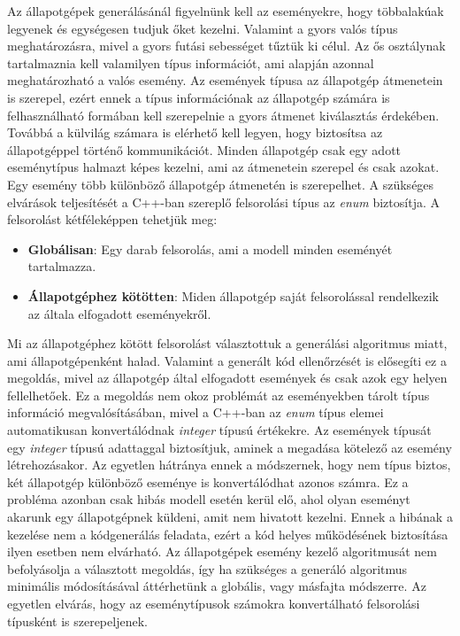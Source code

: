 \documentclass[a4paper,12pt]{report}
\begin{document}
Az állapotgépek generálásánál figyelnünk kell az eseményekre, hogy többalakúak legyenek és egységesen tudjuk őket kezelni. Valamint a gyors valós típus meghatározásra, mivel a gyors futási sebességet tűztük ki célul. Az ős osztálynak tartalmaznia kell valamilyen típus információt, ami alapján azonnal meghatározható a valós esemény. Az események típusa az állapotgép átmenetein is szerepel, ezért ennek a típus információnak az állapotgép számára is felhasználható formában kell szerepelnie a gyors átmenet kiválasztás érdekében. Továbbá a külvilág számara is elérhető kell legyen, hogy biztosítsa az állapotgéppel történő kommunikációt. Minden állapotgép csak egy adott eseménytípus halmazt képes kezelni, ami az átmenetein szerepel és csak azokat. Egy esemény több különböző állapotgép átmenetén is szerepelhet.
A szükséges elvárások teljesítését a C++-ban szereplő felsorolási típus az {\it enum} biztosítja. A felsorolást kétféleképpen tehetjük meg:
\begin{itemize}
\item {\bf Globálisan}: Egy darab felsorolás, ami a modell minden eseményét tartalmazza.
\item {\bf Állapotgéphez kötötten}: Miden állapotgép saját felsorolással rendelkezik az általa elfogadott eseményekről.
\end{itemize}
Mi az állapotgéphez kötött felsorolást választottuk a generálási algoritmus miatt, ami állapotgépenként halad. Valamint a generált kód ellenőrzését is elősegíti ez a megoldás, mivel az állapotgép által elfogadott események és csak azok egy helyen fellelhetőek. Ez a megoldás nem okoz problémát az eseményekben tárolt típus információ megvalósításában, mivel a C++-ban az {\it enum} típus elemei automatikusan konvertálódnak {\it integer} típusú értékekre. Az események típusát egy {\it integer} típusú adattaggal biztosítjuk, aminek a megadása kötelező az esemény létrehozásakor. Az egyetlen hátránya ennek a módszernek, hogy nem típus biztos, két állapotgép különböző eseménye is konvertálódhat azonos számra. Ez a probléma azonban csak hibás modell esetén kerül elő, ahol olyan eseményt akarunk egy állapotgépnek küldeni, amit nem hivatott kezelni. Ennek a hibának a kezelése nem a kódgenerálás feladata, ezért a kód helyes működésének biztosítása ilyen esetben nem elvárható. Az állapotgépek esemény kezelő algoritmusát nem befolyásolja a választott megoldás, így ha szükséges a generáló algoritmus minimális módosításával áttérhetünk a globális, vagy másfajta módszerre. Az egyetlen elvárás, hogy az eseménytípusok számokra konvertálható felsorolási típusként is szerepeljenek. 
\end{document}
